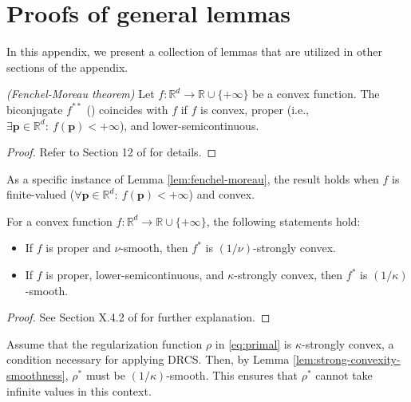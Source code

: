 
\section{Proofs of general lemmas} \label{app:general-lemmas}

In this appendix, we present a collection of lemmas that are utilized in other sections of the appendix.

\begin{lemma}\label{lem:fenchel-moreau} \emph{(Fenchel-Moreau theorem)}
Let $f: \mathbb{R}^d\to\mathbb{R}\cup\{+\infty\}$ be a convex function. The biconjugate $f^{**}$ () coincides with $f$ if $f$ is convex, proper (i.e., $\exists \bm p\in\mathbb{R}^d:~f(\bm p) < +\infty$), and lower-semicontinuous.
\end{lemma}

\begin{proof}
Refer to Section 12 of \citep{rockafellar1970convex} for details.
\end{proof}

As a specific instance of Lemma \ref{lem:fenchel-moreau}, the result holds when $f$ is finite-valued ($\forall \bm p\in\mathbb{R}^d:~f(\bm p)<+\infty$) and convex.

\begin{lemma}\label{lem:strong-convexity-smoothness}
For a convex function $f: \mathbb{R}^d\to\mathbb{R}\cup\{+\infty\}$, the following statements hold:
\begin{itemize}
\item If $f$ is proper and $\nu$-smooth, then $f^*$ is $(1/\nu)$-strongly convex.
\item If $f$ is proper, lower-semicontinuous, and $\kappa$-strongly convex, then $f^*$ is $(1/\kappa)$-smooth.
\end{itemize}
\end{lemma}

\begin{proof}
See Section X.4.2 of \citep{hiriart1993convex} for further explanation.
\end{proof}

\begin{corollary} \label{cor:strong-convexity-smoothness}
Assume that the regularization function $\rho$ in \eqref{eq:primal} is $\kappa$-strongly convex, a condition necessary for applying DRCS. Then, by Lemma \ref{lem:strong-convexity-smoothness}, $\rho^*$ must be $(1/\kappa)$-smooth. This ensures that $\rho^*$ cannot take infinite values in this context.
\end{corollary}

